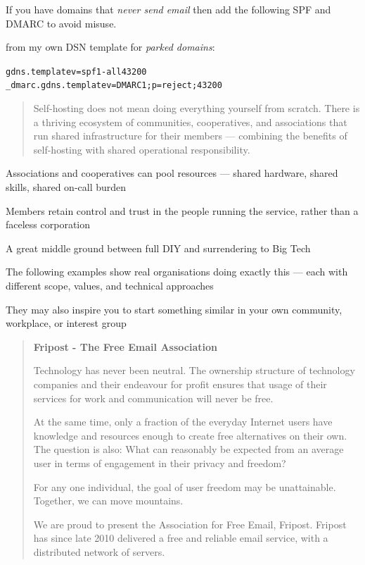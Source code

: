 \documentclass[Screen16to9,17pt]{foils}
\begin{document}
If you have domains that \emph{never send email} then add the following SPF and DMARC to avoid misuse.

from my own DSN template for \emph{parked domains}:
\begin{alltt}
gdns.template   v=spf1 -all     43200
_dmarc.gdns.template    v=DMARC1; p=reject;     43200
\end{alltt}




\begin{quote}
Self-hosting does not mean doing everything yourself from scratch.
There is a thriving ecosystem of communities, cooperatives, and associations
that run shared infrastructure for their members — combining the benefits
of self-hosting with shared operational responsibility.
\end{quote}

\begin{list2}
\item Associations and cooperatives can pool resources — shared hardware,
shared skills, shared on-call burden
\item Members retain control and trust in the people running the service,
rather than a faceless corporation
\item A great middle ground between full DIY and surrendering to Big Tech
\item The following examples show real organisations doing exactly this —
each with different scope, values, and technical approaches
\item They may also inspire you to start something similar in your own community,
workplace, or interest group
\end{list2}



\begin{quote}{\bf \large
Fripost - The Free Email Association}

Technology has never been neutral. The ownership structure of technology companies and their endeavour for profit ensures that usage of their services for work and communication will never be free.

At the same time, only a fraction of the everyday Internet users have knowledge and resources enough to create free alternatives on their own. The question is also: What can reasonably be expected from an average user in terms of engagement in their privacy and freedom?

For any one individual, the goal of user freedom may be unattainable. Together, we can move mountains.

We are proud to present the Association for Free Email, Fripost. Fripost has since late 2010 delivered a free and reliable email service, with a distributed network of servers.
\end{quote}
\end{document}
